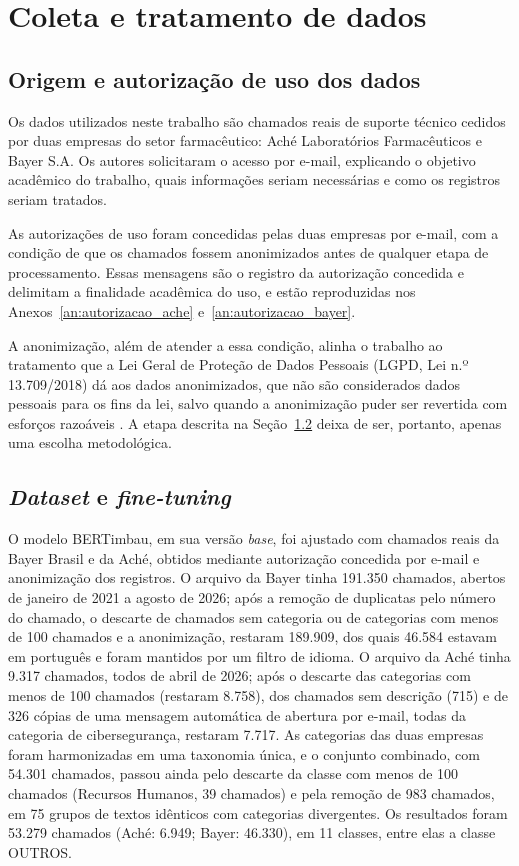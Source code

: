 \documentclass[
    12pt,                %
    openright,           %
    oneside,             %
    a4paper,             %
    english,             %
    brazil               %
]{abntex2}
\begin{document}
\section{Coleta e tratamento de dados}
\subsection{Origem e autorização de uso dos dados}
\label{subsubsec:autorizacao_dados}

Os dados utilizados neste trabalho são chamados reais de suporte
técnico cedidos por duas empresas do setor farmacêutico: Aché
Laboratórios Farmacêuticos e Bayer S.A. Os autores solicitaram o
acesso por e-mail, explicando o objetivo acadêmico do trabalho, quais
informações seriam necessárias e como os registros seriam tratados.

As autorizações de uso foram concedidas pelas duas empresas por e-mail,
com a condição de que os chamados fossem anonimizados antes de qualquer
etapa de processamento. Essas mensagens são o registro da autorização
concedida e delimitam a finalidade acadêmica do uso, e estão
reproduzidas nos Anexos~\ref{an:autorizacao_ache}
e~\ref{an:autorizacao_bayer}.

A anonimização, além de atender a essa condição, alinha o trabalho ao
tratamento que a Lei Geral de Proteção de Dados Pessoais (LGPD, Lei
n.º 13.709/2018) dá aos dados anonimizados, que não são considerados
dados pessoais para os fins da lei, salvo quando a anonimização puder
ser revertida com esforços razoáveis \cite{brasil2018}. A etapa
descrita na Seção~\ref{subsubsec:dataset_finetuning} deixa de ser,
portanto, apenas uma escolha metodológica.



\subsection{\textit{Dataset} e \textit{fine-tuning}}
\label{subsubsec:dataset_finetuning}

O modelo BERTimbau, em sua versão \textit{base}, foi ajustado com chamados reais da Bayer Brasil e da Aché, obtidos mediante autorização concedida por e-mail e anonimização dos registros. O arquivo da Bayer tinha 191.350 chamados, abertos de janeiro de 2021 a agosto de 2026; após a remoção de duplicatas pelo número do chamado, o descarte de chamados sem categoria ou de categorias com menos de 100 chamados e a anonimização, restaram 189.909, dos quais 46.584 estavam em português e foram mantidos por um filtro de idioma. O arquivo da Aché tinha 9.317 chamados, todos de abril de 2026; após o descarte das categorias com menos de 100 chamados (restaram 8.758), dos chamados sem descrição (715) e de 326 cópias de uma mensagem automática de abertura por e-mail, todas da categoria de cibersegurança, restaram 7.717. As categorias das duas empresas foram harmonizadas em uma taxonomia única, e o conjunto combinado, com 54.301 chamados, passou ainda pelo descarte da classe com menos de 100 chamados (Recursos Humanos, 39 chamados) e pela remoção de 983 chamados, em 75 grupos de textos idênticos com categorias divergentes. Os resultados foram 53.279 chamados (Aché: 6.949; Bayer: 46.330), em 11 classes, entre elas a classe OUTROS.
\end{document}

